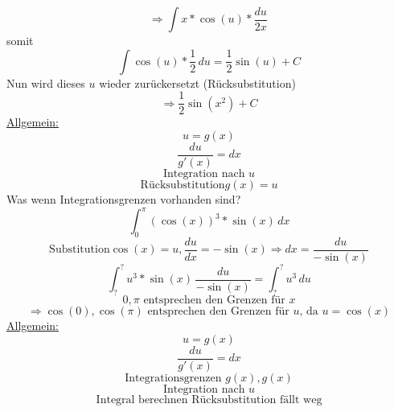 \documentclass[11pt]{amsart}
\theoremstyle{remark}
\begin{document}
\begin{equation*}
	\Rightarrow \int x*\cos(u)* \frac {du}{2x} \,
\end{equation*}
somit
\begin{equation*}
	\int \cos(u)* \frac 1{2} \,du = \frac 12 \sin(u) + C
\end{equation*}
Nun wird dieses $u$ wieder zur\"uckersetzt (R\"ucksubstitution)
\begin{equation*}
		\Rightarrow \frac 12 \sin(x^2) + C
\end{equation*}
\underline{Allgemein:}
\begin{equation*}
	u = g(x)
\end{equation*}
\begin{equation*}
	\frac {du}{g'(x)} = dx
\end{equation*}
\begin{equation*}
	\text{Integration nach } u
\end{equation*}
\begin{equation*}
	\text{R\"ucksubstitution} g(x) =u
\end{equation*}
Was wenn Integrationsgrenzen vorhanden sind?
\begin{equation*}
	\int_0^\pi (\cos(x))^3*\sin(x)\,dx
\end{equation*}
\begin{equation*}
	\text{Substitution} \cos(x) =u, \frac {du}{dx} = -\sin(x) \Rightarrow dx = \frac{du}{-\sin(x)}
\end{equation*}
\begin{equation*}
	\int_?^? u^3*\sin(x)\,\frac{du}{-\sin(x)} = 	\int_?^? u^3\,du
\end{equation*}
\begin{equation*}
	0,\pi \text{ entsprechen den Grenzen f\"ur } x
\end{equation*}
\begin{equation*}
	\Rightarrow \cos(0),\cos(\pi) \text{ entsprechen den Grenzen f\"ur } u \text{, da } u = \cos(x)
\end{equation*}
\underline{Allgemein:}
\begin{equation*}
	u = g(x)
\end{equation*}
\begin{equation*}
	\frac {du}{g'(x)} = dx
\end{equation*}
\begin{equation*}
	\text{Integrationsgrenzen } g(x),g(x)
\end{equation*}
\begin{equation*}
	\text{Integration nach } u
\end{equation*}
\begin{equation*}
	\text{Integral berechnen R\"ucksubstitution f\"allt weg}
\end{equation*}
\end{document}
